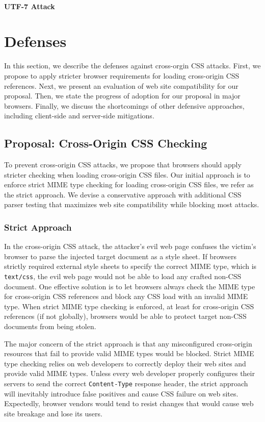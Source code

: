 \documentclass{acm_proc_article-sp}
\begin{document}
\paragraph{UTF-7 Attack}


\section{Defenses} \label{sec:defenses}
In this section, we describe the defenses against cross-orgin CSS attacks. First, we propose to apply stricter browser requirements for loading cross-origin CSS references. Next, we present an evaluation of web site compatibility for our proposal. Then, we state the progress of adoption for our proposal in major browsers. Finally, we discuss the shortcomings of other defensive approaches, including client-side and server-side mitigations.

\subsection{Proposal: Cross-Origin CSS Checking}
To prevent cross-origin CSS attacks, we propose that browsers should apply stricter checking when loading cross-origin CSS files. Our initial approach is to enforce strict MIME type checking for loading cross-origin CSS files, we refer as the strict approach. We devise a conservative approach with additional CSS parser testing that maximizes web site compatibility while blocking most attacks.

\subsubsection{Strict Approach}
In the cross-origin CSS attack, the attacker's evil web page confuses the victim's browser to parse the injected target document as a style sheet. If browsers strictly required external style sheets to specify the correct MIME type, which is \texttt{text/css}, the evil web page would not be able to load any crafted non-CSS document. One effective solution is to let browsers always check the MIME type for cross-origin CSS references and block any CSS load with an invalid MIME type. When strict MIME type checking is enforced, at least for cross-origin CSS references (if not globally), browsers would be able to protect target non-CSS documents from being stolen.

The major concern of the strict approach is that any misconfigured cross-origin resources that fail to provide valid MIME types would be blocked. Strict MIME type checking relies on web developers to correctly deploy their web sites and provide valid MIME types. Unless every web developer properly configures their servers to send the correct \texttt{Content-Type} response header, the strict approach will inevitably introduce false positives and cause CSS failure on web sites. Expectedly, browser vendors would tend to resist changes that would cause web site breakage and lose its users.
\end{document}
